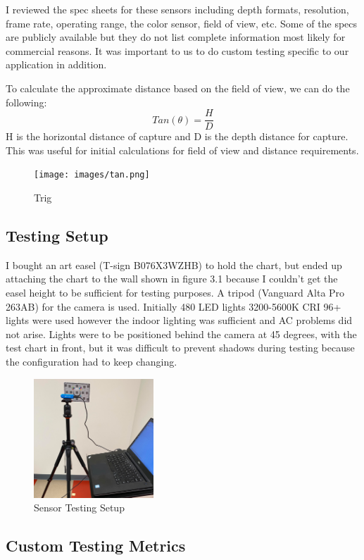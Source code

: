 I reviewed the spec sheets for these sensors including depth formats, resolution, frame rate, operating range, the color sensor, field of view, etc.
Some of the specs are publicly available but they do not list complete information most likely for commercial reasons. It was important to us to do custom testing specific to our application in addition.

To calculate the approximate distance based on the field of view, we can do the following:
\begin{equation}
	Tan(\theta) = \frac{H}{D}
\end{equation}
H is the horizontal distance of capture and D is the depth distance for capture. This was useful for initial calculations for field of view and distance requirements.
\begin{figure}[!htb]
	\caption{Trig}
	\centering
	\texttt{[image: images/tan.png]}
\end{figure}

\subsection{Testing Setup}
I bought an art easel (T-sign B076X3WZHB) to hold the chart, but ended up attaching the chart to the wall shown in figure 3.1 because I couldn't get the easel height to be sufficient for testing purposes. A tripod (Vanguard Alta Pro 263AB) for the camera is used. Initially 480 LED lights 3200-5600K CRI 96+ lights were used however the indoor lighting was sufficient and AC problems did not arise. Lights were to be positioned behind the camera at 45 degrees, with the test chart in front, but it was difficult to prevent shadows during testing because the configuration had to keep changing. 
\begin{figure}[!htb]
	\caption{Sensor Testing Setup}
	\centering
	\includegraphics[width=0.4\textwidth, angle=0]{images/sensor_testing.png}
\end{figure}

\subsection{Custom Testing Metrics}

